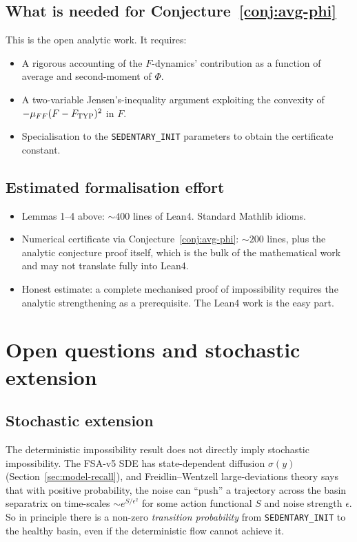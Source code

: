 \documentclass[11pt,a4paper]{article}
\theoremstyle{definition}
\begin{document}
\subsection{What is needed for Conjecture~\ref{conj:avg-phi}}

This is the open analytic work. It requires:

\begin{itemize}
  \item A rigorous accounting of the $F$-dynamics' contribution as a function of average and second-moment of $\Phi$.
  \item A two-variable Jensen's-inequality argument exploiting the convexity of $-\mu_{FF}(F - F_{\rm TYP})^2$ in $F$.
  \item Specialisation to the \texttt{SEDENTARY\_INIT} parameters to obtain the certificate constant.
\end{itemize}

\subsection{Estimated formalisation effort}

\begin{itemize}
  \item Lemmas 1--4 above: $\sim 400$ lines of Lean4. Standard Mathlib idioms.
  \item Numerical certificate via Conjecture~\ref{conj:avg-phi}: $\sim 200$ lines, plus the analytic conjecture proof itself, which is the bulk of the mathematical work and may not translate fully into Lean4.
  \item Honest estimate: a complete mechanised proof of impossibility requires the analytic strengthening as a prerequisite. The Lean4 work is the easy part.
\end{itemize}

\section{Open questions and stochastic extension} \label{sec:open-questions}

\subsection{Stochastic extension}

The deterministic impossibility result does not directly imply stochastic impossibility. The FSA-v5 SDE has state-dependent diffusion $\sigma(y)$ (Section~\ref{sec:model-recall}), and Freidlin--Wentzell large-deviations theory says that with positive probability, the noise can ``push'' a trajectory across the basin separatrix on time-scales $\sim e^{S/\epsilon^2}$ for some action functional $S$ and noise strength $\epsilon$. So in principle there is a non-zero \emph{transition probability} from \texttt{SEDENTARY\_INIT} to the healthy basin, even if the deterministic flow cannot achieve it.
\end{document}

